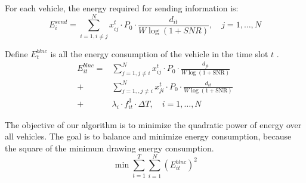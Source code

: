 \documentclass[conference]{IEEEtran}
\begin{document}
For each vehicle, the energy required for sending information is:
\begin{equation}
	E_{i}^{send}=\sum_{i =1, i \ne j}^{N} x _{ij}^{t} \cdot P_0 \cdot \frac{d_{it}}{W\log (1 + SNR)},
	\quad  j = 1, \dots ,N
\end{equation}    

Define $E^{blnc}_ {t} $ is all the energy consumption of the vehicle in the time slot $t$ .
\begin{equation}
	\begin{aligned}
		E^{blnc} _{it}=
		&\sum_{j=1, j \ne i}^{N} x _{ij}^{t} \cdot P_0 \cdot \frac{d_{jt}}{W\log (1 + \text{SNR})}   \\
		+ &\sum_{j=1, , j \ne i}^{N} x _{ji}^{t} \cdot P_0 \cdot \frac{d_{it}}{W\log (1 + \text{SNR})}   \\
		+ &  \lambda_{i} \cdot f_{it}^{3} \cdot \Delta T
		, \quad i = 1, \dots ,N	
	\end{aligned}
\end{equation}

	The objective of our algorithm is to minimize the quadratic power of energy over all vehicles. The goal is to balance and minimize energy consumption, because the square of the minimum drawing energy consumption.
\begin{equation}
	\min\sum \limits _{t=1} ^{T} \sum \limits _{i=1}^{N} (E^{blnc}_{it} )^ 2
\end{equation}
\end{document}
